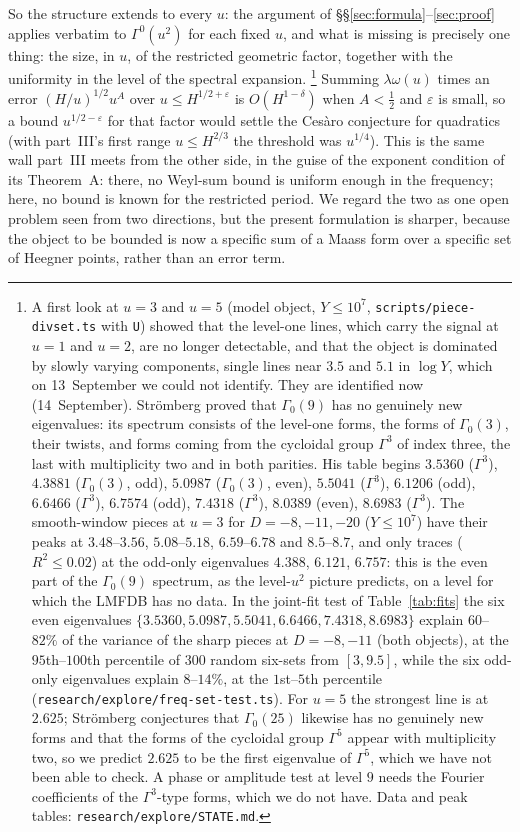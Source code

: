 \documentclass[11pt,a4paper]{article}
\theoremstyle{remark}\newtheorem{remark}[theorem]{Remark}
\begin{document}
So the structure extends to every $u$: the argument of \S\S\ref{sec:formula}--\ref{sec:proof} applies verbatim to
$\Gamma^0(u^2)$ for each fixed $u$, and what is missing is precisely one thing: the size, in $u$, of the restricted
geometric factor, together with the uniformity in the level of the spectral expansion. \footnote{A first look at
$u=3$ and $u=5$ (model object, $Y\le10^7$, \texttt{scripts/piece-divset.ts} with \texttt{U}) showed that the
level-one lines, which carry the signal at $u=1$ and $u=2$, are no longer detectable, and that the object is dominated by
slowly varying components, single lines near $3.5$ and $5.1$ in $\log Y$, which on 13~September we could not identify.
They are identified now (14~September). Str\"omberg \cite{Stromberg2012} proved that $\Gamma_0(9)$ has no genuinely new
eigenvalues: its spectrum consists of the level-one forms, the forms of $\Gamma_0(3)$, their twists, and forms coming
from the cycloidal group $\Gamma^3$ of index three, the last with multiplicity two and in both parities. His table
begins $3.5360$ ($\Gamma^3$), $4.3881$ ($\Gamma_0(3)$, odd), $5.0987$ ($\Gamma_0(3)$, even), $5.5041$ ($\Gamma^3$),
$6.1206$ (odd), $6.6466$ ($\Gamma^3$), $6.7574$ (odd), $7.4318$ ($\Gamma^3$), $8.0389$ (even), $8.6983$ ($\Gamma^3$).
The smooth-window pieces at $u=3$ for $D=-8,-11,-20$ ($Y\le10^7$) have their peaks at $3.48$--$3.56$, $5.08$--$5.18$,
$6.59$--$6.78$ and $8.5$--$8.7$, and only traces ($R^2\le0.02$) at the odd-only eigenvalues $4.388$, $6.121$, $6.757$:
this is the even part of the $\Gamma_0(9)$ spectrum, as the level-$u^2$ picture predicts, on a level for which the LMFDB
has no data. In the joint-fit test of Table~\ref{tab:fits} the six even eigenvalues $\{3.5360,5.0987,5.5041,6.6466,7.4318,
8.6983\}$ explain $60$--$82\%$ of the variance of the sharp pieces at $D=-8,-11$ (both objects), at the $95$th--$100$th
percentile of $300$ random six-sets from $[3,9.5]$, while the six odd-only eigenvalues explain $8$--$14\%$, at the
$1$st--$5$th percentile (\texttt{research/explore/freq-set-test.ts}). For $u=5$ the strongest line is at $2.625$; Str\"omberg conjectures that $\Gamma_0(25)$ likewise has no
genuinely new forms and that the forms of the cycloidal group $\Gamma^5$ appear with multiplicity two, so we predict
$2.625$ to be the first eigenvalue of $\Gamma^5$, which we have not been able to check. A phase or amplitude test at
level $9$ needs the Fourier coefficients of the $\Gamma^3$-type forms, which we do not have. Data and peak tables:
\texttt{research/explore/STATE.md}.} Summing $\lambda\omega(u)$ times an error $(H/u)^{1/2}u^{A}$ over $u\le H^{1/2+\varepsilon}$ is
$O(H^{1-\delta})$ when $A<\tfrac12$ and $\varepsilon$ is small, so a bound $u^{1/2-\varepsilon}$ for that factor would settle the Ces\`aro
conjecture for quadratics (with part~III's first range $u\le H^{2/3}$ the threshold was $u^{1/4}$). This is the same wall part~III meets from the other side, in the guise of the exponent
condition of its Theorem~A: there, no Weyl-sum bound is uniform enough in the frequency; here, no bound is known for the
restricted period. We regard the two as one open problem seen from two directions, but the present formulation is
sharper, because the object to be bounded is now a specific sum of a Maass form over a specific set of Heegner
points, rather than an error term.
\end{document}
